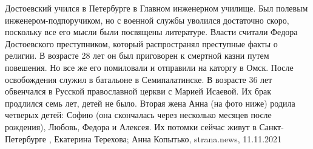  
 
 
 
 

Достоевский учился в Петербурге в Главном инженерном училище. Был полевым
инженером-подпоручиком, но с военной службы уволился достаточно скоро,
поскольку все его мысли были посвящены литературе.  Власти считали Федора
Достоевского преступником, который распространял преступные факты о религии. В
возрасте 28 лет он был приговорен к смертной казни путем повешения. Но все же
его помиловали и отправили на каторгу в Омск.  После освобождения служил в
батальоне в Семипалатинске.  В возрасте 36 лет обвенчался в Русской
православной церкви с Марией Исаевой. Их брак продлился семь лет, детей не
было.  Вторая жена Анна (на фото ниже) родила четверых детей: Софию (она
скончалась через несколько месяцев после рождения), Любовь, Федора и Алексея.
Их потомки сейчас живут в Санкт-Петербурге
, 
Екатерина Терехова; Анна Копытько, strana.news, 11.11.2021

